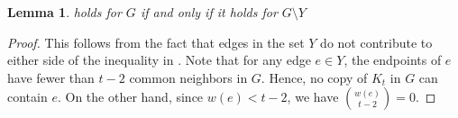 \documentclass[10pt,a4paper]{amsart}
\newtheorem{lemma}{Lemma}
\begin{document}
\begin{lemma}\label{lem2}
 holds for $G$ if and only if it holds for $G\setminus Y$
\end{lemma} 

   \begin{proof}
This follows from the fact that edges in the set $Y$ do not contribute to either side of the inequality in . Note that for any edge $e \in Y$, the endpoints of $e$ have fewer than $t-2$ common neighbors in $G$. Hence, no copy of $K_t$ in $G$ can contain $e$. On the other hand, since $w(e) < t-2$, we have ${w(e) \choose t-2} = 0$. 
\end{proof}
\end{document}

